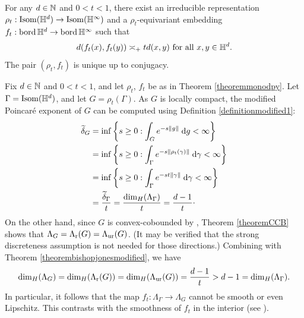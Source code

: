 \begin{theorem}
\label{theoremmonodpy}
For any $d\in\N$ and $0 < t < 1$, there exist an irreducible representation $\rho_t:\Isom(\H^d)\to\Isom(\H^\infty)$ and a $\rho_t$-equivariant embedding $f_t:\bord\H^d\to\bord\H^\infty$ such that
\begin{equation}
\label{monodpy}
\dist(f_t(x),f_t(y)) \asymp_\plus t \dist(x,y) \text{ for all $x,y\in\H^d$.}
\end{equation}
The pair $(\rho_t,f_t)$ is unique up to conjugacy.
\end{theorem}



\begin{example}
\label{examplemonodpy}
Fix $d\in\N$ and $0 < t < 1$, and let $\rho_t$, $f_t$ be as in Theorem \ref{theoremmonodpy}. Let $\Gamma = \Isom(\H^d)$, and let $G = \rho_t(\Gamma)$. As $G$ is locally compact, the modified Poincar\'e exponent of $G$ can be computed using Definition \ref{definitionmodified1}:
\begin{align*}
\widetilde\delta_G &= \inf\left\{s\geq 0 : \int_G e^{-s\|g\|}\;\mathrm{d} g < \infty \right\}\\
&= \inf\left\{s\geq 0 : \int_\Gamma e^{-s\|\rho_t(\gamma)\|}\;\mathrm{d} \gamma < \infty \right\}\\
&= \inf\left\{s\geq 0 : \int_\Gamma e^{-st\|\gamma\|}\;\mathrm{d} \gamma < \infty \right\}\\
&= \frac{\widetilde\delta_\Gamma}{t} = \frac{{\dim_H}(\Lambda_\Gamma)}{t} = \frac{d - 1}{t}\cdot
\end{align*}
On the other hand, since $G$ is convex-cobounded by \cite[Theorem D]{MonodPy}, Theorem \ref{theoremCCB} shows that $\Lambda_G = \Lambda_{\mathrm r}(G) = \Lambda_{\mathrm{ur}}(G)$. (It may be verified that the strong discreteness assumption is not needed for those directions.) Combining with Theorem \ref{theorembishopjonesmodified}, we have
\[
{\dim_H}(\Lambda_G) = {\dim_H}(\Lambda_{\mathrm r}(G)) = {\dim_H}(\Lambda_{\mathrm{ur}}(G)) = \frac{d - 1}{t} > d - 1 = {\dim_H}(\Lambda_\Gamma).
\]
In particular, it follows that the map $f_t:\Lambda_\Gamma\to\Lambda_G$ cannot be smooth or even Lipschitz. This contrasts with the smoothness of $f_t$ in the interior (see \cite[Theorem C(2)]{MonodPy}).
\end{example}

